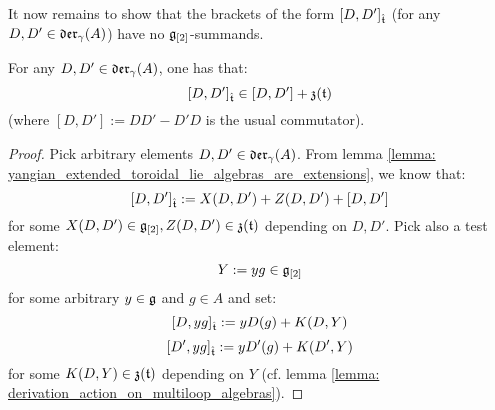         It now remains to show that the brackets of the form $[D, D']_{\hat{\mathfrak{t}}}$ (for any $D, D' \in \mathfrak{der}_{\gamma}(A)$) have no $\mathfrak{g}_{[2]}$-summands.
        \begin{proposition} \label{prop: appearance_of_toroidal_cocycles}
            For any $D, D' \in \mathfrak{der}_{\gamma}(A)$, one has that:
                $$[D, D']_{\hat{\mathfrak{t}}} \in [D, D'] + \mathfrak{z}(\mathfrak{t})$$
            (where $[D, D'] := DD' - D'D$ is the usual commutator).
        \end{proposition}
            \begin{proof}
                Pick arbitrary elements $D, D' \in \mathfrak{der}_{\gamma}(A)$. From lemma \ref{lemma: yangian_extended_toroidal_lie_algebras_are_extensions}, we know that:
                    $$[D, D']_{\hat{\mathfrak{t}}} := X(D, D') + Z(D, D') + [D, D']$$
                for some $X(D, D') \in \mathfrak{g}_{[2]}, Z(D, D') \in \mathfrak{z}(\mathfrak{t})$ depending on $D, D'$. Pick also a test element:
                    $$Y := yg \in \mathfrak{g}_{[2]}$$
                for some arbitrary $y \in \mathfrak{g}$ and $g \in A$ and set:
                    $$[D, y g]_{\hat{\mathfrak{t}}} := y D( g ) + K(D, Y)$$
                    $$[D', y g]_{\hat{\mathfrak{t}}} := y D'( g ) + K(D', Y)$$
                for some $K(D, Y) \in \mathfrak{z}(\mathfrak{t})$ depending on $Y$ (cf. lemma \ref{lemma: derivation_action_on_multiloop_algebras}).
                

\end{proof}
